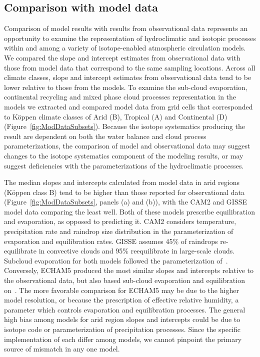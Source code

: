 \documentclass[draft, linenumbers]{agujournal2018}
\begin{document}
\subsection{Comparison with model data}
Comparison of model results with results from observational data represents an opportunity to examine the representation of hydroclimatic and isotopic processes within and among a variety of isotope-enabled atmospheric circulation models. We compared the slope and intercept estimates from observational data with those from model data that correspond to the same sampling locations. Across all climate classes, slope and intercept estimates from observational data tend to be lower relative to those from the models. To examine the sub-cloud evaporation, continental recycling and mixed phase cloud processes representation in the models we extracted and compared model data from grid cells that corresponded to K{\"o}ppen climate classes of Arid (B), Tropical (A) and Continental (D) (Figure~\ref{fig:ModDataSubsets}). Because the isotope systematics producing the result are dependent on both the water balance and cloud process parameterizations, the comparison of model and observational data may suggest changes to the isotope systematics component of the modeling results, or may suggest deficiencies with the parameterizations of the hydroclimatic processes.

The median slopes and intercepts calculated from model data in arid regions (K{\"o}ppen class B) tend to be higher than those reported for observational data (Figure~\ref{fig:ModDataSubsets}, panels (a) and (b)), with the CAM2 and GISSE model data comparing the least well. Both of these models prescribe equilibration and evaporation, as opposed to predicting it.  CAM2 considers temperature, precipitation rate and raindrop size distribution in the parameterization of evaporation and equilibration rates. GISSE assumes 45\% of raindrops re-equilibrate in convective clouds and 95\% reequilibrate in large-scale clouds. Subcloud evaporation for both models followed the parameterization of~\citet{Stewart1975}. Conversely, ECHAM5 produced the most similar slopes and intercepts relative to the observational data, but also based sub-cloud evaporation and equilibration on~\citet{Stewart1975}. The more favorable comparison for ECHAM5 may be due to the higher model resolution, or because the prescription of effective relative humidity, a parameter which controls evaporation and equilibration processes. The general high bias among models for arid region slopes and intercepts could be due to isotope code or parameterization of precipitation processes. Since the specific implementation of each differ among models, we cannot pinpoint the primary source of mismatch in any one model. 
\end{document}
